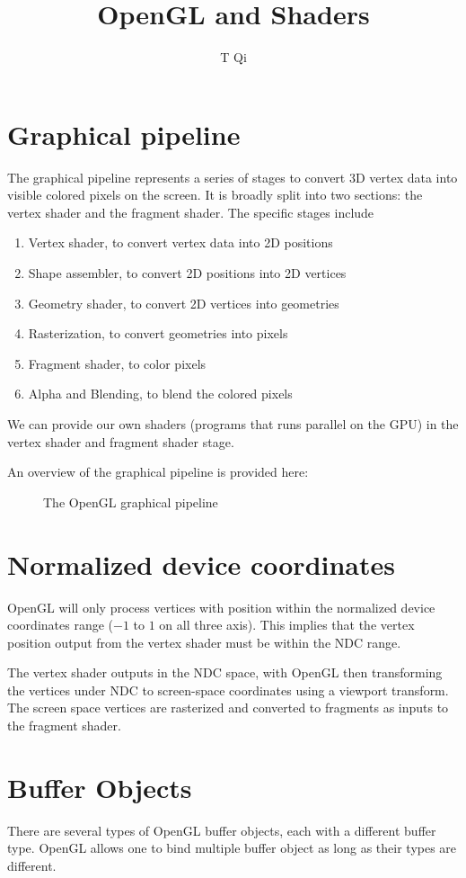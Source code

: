 \documentclass[11pt]{article}
\title{OpenGL and Shaders}
\author{T Qi}
\numberwithin{equation}{section}
\begin{document}
\maketitle
\newpage

\section{Graphical pipeline}
The graphical pipeline represents a series of stages to convert 3D vertex data into visible colored pixels on the screen. It is broadly split into two sections: the vertex shader and the fragment shader. The specific stages include
\begin{enumerate}
	\item Vertex shader, to convert vertex data into 2D positions
	\item Shape assembler, to convert 2D positions into 2D vertices
	\item Geometry shader, to convert 2D vertices into geometries
	\item Rasterization, to convert geometries into pixels
	\item Fragment shader, to color pixels
	\item Alpha and Blending, to blend the colored pixels
\end{enumerate}
We can provide our own shaders (programs that runs parallel on the GPU) in the vertex shader and fragment shader stage.

An overview of the graphical pipeline is provided here:
\begin{figure}[H]
	
	\caption{The OpenGL graphical pipeline}
\end{figure}



\section{Normalized device coordinates}
OpenGL will only process vertices with position within the normalized device coordinates range ($-1$ to $1$ on all three axis). This implies that the vertex position output from the vertex shader must be within the NDC range.

The vertex shader outputs in the NDC space, with OpenGL then transforming the vertices under NDC to screen-space coordinates using a viewport transform. The screen space vertices are rasterized and converted to fragments as inputs to the fragment shader.

\section{Buffer Objects}
There are several types of OpenGL buffer objects, each with a different buffer type. OpenGL allows one to bind multiple buffer object as long as their types are different.
\end{document}
